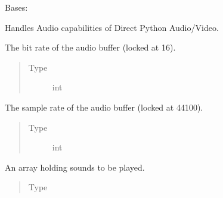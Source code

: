 \documentclass[letterpaper,10pt,english,openany,oneside]{sphinxmanual}
\begin{document}
\begin{fulllineitems}

\pysigstartsignatures
{}
\pysigstopsignatures
\sphinxAtStartPar
Bases: 

\sphinxAtStartPar
Handles Audio capabilities of Direct Python Audio/Video.


\begin{fulllineitems}

\pysigstartsignatures
{}
\pysigstopsignatures
\sphinxAtStartPar
The bit rate of the audio buffer (locked at 16).
\begin{quote}\begin{description}
\item[{Type}] \leavevmode
\sphinxAtStartPar
int

\end{description}\end{quote}

\end{fulllineitems}



\begin{fulllineitems}

\pysigstartsignatures
{}
\pysigstopsignatures
\sphinxAtStartPar
The sample rate of the audio buffer (locked at 44100).
\begin{quote}\begin{description}
\item[{Type}] \leavevmode
\sphinxAtStartPar
int

\end{description}\end{quote}

\end{fulllineitems}



\begin{fulllineitems}

\pysigstartsignatures
{}
\pysigstopsignatures
\sphinxAtStartPar
An array holding sounds to be played.
\begin{quote}\begin{description}
\item[{Type}] \leavevmode
\sphinxAtStartPar
{}


\end{description}
\end{quote}
\end{fulllineitems}
\end{fulllineitems}
\end{document}
